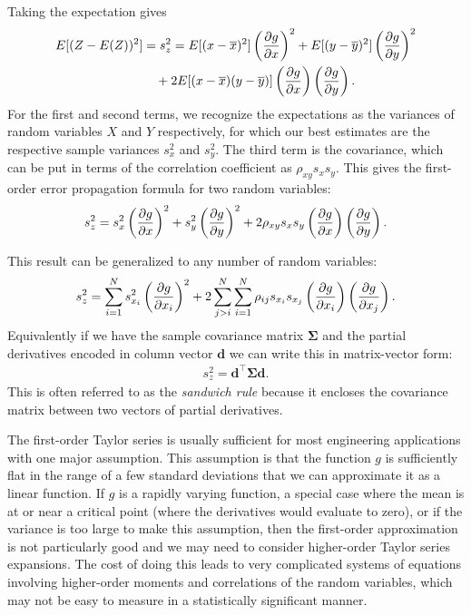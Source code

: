 Taking the expectation gives
\begin{align}
  E[( Z - E(Z) )^2] &= s_z^2 = E[( x - \overline{x} )^2 ] \left( \frac{ \partial {g} }{ \partial {x} } \right)^2 + E[( y - \overline{y} )^2] \left( \frac{ \partial {g} }{ \partial {y} } \right)^2 \nonumber \\* 
  &\quad + 2 E[ ( x - \overline{x} ) ( y - \overline{y} ) ] \left( \frac{ \partial {g} }{ \partial {x} } \right) \left( \frac{ \partial {g} }{ \partial {y} } \right) . \nonumber
\end{align}
For the first and second terms, we recognize the expectations as the variances of random variables $X$ and $Y$ respectively, for which our best estimates are the respective sample variances $s_x^2$ and $s_y^2$. The third term is the covariance, which can be put in terms of the correlation coefficient as $\rho_{xy} s_x s_y$. This gives the first-order error propagation formula for two random variables:
\begin{align}
  s_z^2 = s_x^2 \left( \frac{ \partial {g} }{ \partial {x} } \right)^2 + s_y^2 \left( \frac{ \partial {g} }{ \partial {y} } \right)^2 
  + 2 \rho_{xy} s_x s_y \left( \frac{ \partial {g} }{ \partial {x} } \right) \left( \frac{ \partial {g} }{ \partial {y} } \right) . 
\end{align}

This result can be generalized to any number of random variables:
\begin{align}
  s_z^2 = \sum_{i=1}^N s_{x_i}^2  \left( \frac{ \partial {g} }{ \partial {x_i} } \right)^2 + 2 \sum_{j > i}^N \sum_{i=1}^N \rho_{ij} s_{x_i} s_{x_j}  \left( \frac{ \partial {g} }{ \partial {x_i} } \right)  \left( \frac{ \partial {g} }{ \partial {x_j} } \right) .
\end{align}
Equivalently if we have the sample covariance matrix $\boldsymbol\Sigma$ and the partial derivatives encoded in column vector $\mathbf{d}$ we can write this in matrix-vector form:
\begin{align}
  s_z^2 = \mathbf{d}^\top \boldsymbol\Sigma \mathbf{d}  .
\end{align}
This is often referred to as the \emph{sandwich rule} because it encloses the covariance matrix between two vectors of partial derivatives.

The first-order Taylor series is usually sufficient for most engineering applications with one major assumption. This assumption is that the function $g$ is sufficiently flat in the range of a few standard deviations that we can approximate it as a linear function. If $g$ is a rapidly varying function, a special case where the mean is at or near a critical point (where the derivatives would evaluate to zero), or if the variance is too large to make this assumption, then the first-order approximation is not particularly good and we may need to consider higher-order Taylor series expansions. The cost of doing this leads to very complicated systems of equations involving higher-order moments and correlations of the random variables, which may not be easy to measure in a statistically significant manner.

